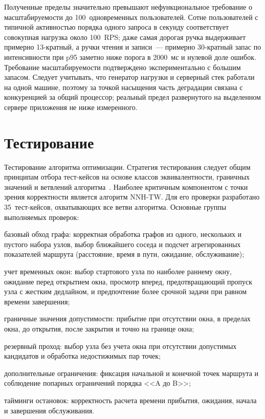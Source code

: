 Полученные пределы значительно превышают нефункциональное требование о
масштабируемости до 100~одновременных пользователей. Сотне пользователей с
типичной активностью порядка одного запроса в секунду соответствует совокупная
нагрузка около 100~RPS; даже самая дорогая ручка выдерживает примерно
13-кратный, а ручки чтения и записи~--- примерно 30-кратный запас по
интенсивности при p95 заметно ниже порога в 2000~мс и нулевой доле ошибок.
Требование масштабируемости подтверждено экспериментально с большим запасом.
Следует учитывать, что генератор нагрузки и серверный стек работали на одной
машине, поэтому за точкой насыщения часть деградации связана с конкуренцией за
общий процессор; реальный предел развернутого на выделенном сервере приложения
не ниже измеренного.

\section{Тестирование}

Тестирование алгоритма оптимизации. Стратегия тестирования следует общим принципам отбора тест-кейсов на
основе классов эквивалентности, граничных значений и ветвлений
алгоритма~\cite{kulikov2017testing,myers2018testing}.
Наиболее критичным компонентом с точки зрения корректности является
алгоритм NNH-TW. Для его проверки разработано 35~тест-кейсов,
охватывающих все ветви алгоритма. Основные группы выполняемых проверок:

\begin{compactlist}
  \item базовый обход графа: корректная обработка графов из одного, нескольких
        и пустого набора узлов, выбор ближайшего соседа и подсчет агрегированных
        показателей маршрута (расстояние, время в пути, ожидание, обслуживание);
  \item учет временных окон: выбор стартового узла по наиболее раннему окну,
        ожидание перед открытием окна, просмотр вперед, предотвращающий пропуск
        узла с жестким дедлайном, и предпочтение более срочной задачи при равном
        времени завершения;
  \item граничные значения допустимости: прибытие при отсутствии окна,
        в пределах окна, до открытия, после закрытия и точно на границе окна;
  \item резервный проход: выбор узла без учета окна при отсутствии допустимых
        кандидатов и обработка недостижимых пар точек;
  \item дополнительные ограничения: фиксация начальной и конечной точек
        маршрута и соблюдение попарных ограничений порядка <<A до B>>;
  \item тайминги остановок: корректность расчета времени прибытия, ожидания,
        начала и завершения обслуживания.
\end{compactlist}

